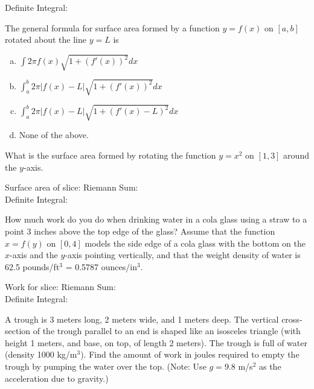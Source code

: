 \documentclass[answers]{exam}
\begin{document}
\begin{questions}
Definite Integral: \\

\hfill \break
\hfill \break
\hfill \break
\hfill \break
\hfill \break

\question The general formula for surface area formed by a function $y = f(x)$ on $[a, b]$ rotated about the line $y = L$ is 

  \begin{enumerate}[(a)]
  	\item $\displaystyle \int 2\pi f(x)\sqrt{1+\left(f'(x)\right)^2}dx$
  	\item $\displaystyle \int_a^b 2\pi |f(x)-L|\sqrt{1+\left(f'(x)\right)^2}dx$
  	\item $\displaystyle \int_a^b 2\pi |f(x)-L|\sqrt{1+\left(f'(x)-L\right)^2}dx$
  \item None of the above.
\end{enumerate}

\question What is the surface area formed by rotating the function $y = x^2$ on $[1, 3]$ around the $y$-axis.

Surface area of slice: \hspace{2in} Riemann Sum:\\

Definite Integral: \\

\hfill \break
\hfill \break
\hfill \break
\hfill \break
\hfill \break

\question How much work do you do when drinking water in a cola glass using a straw to a point 3 inches above the top edge of the glass? Assume that the function $x = f(y)$ on $[0, 4]$ models the side edge of a cola glass with the bottom on the $x$-axis and the $y$-axis pointing vertically, and that the weight density of water is 62.5 pounds/ft$^3$ = 0.5787 ounces/in$^3$.

Work for slice: \hspace{2in} Riemann Sum:\\

Definite Integral: \\

\vfill

\question  A trough is 3 meters long, 2 meters wide, and 1 meters deep. The vertical cross-section of the trough parallel to an end is shaped like an isosceles triangle (with height 1 meters, and base, on top, of length 2 meters). The trough is full of water (density 1000 kg/m$^3$). Find the amount of work in joules required to empty the trough by pumping the water over the top. (Note: Use $g=9.8$ m/s$^2$ as the acceleration due to gravity.) 


\end{questions}
\end{document}
